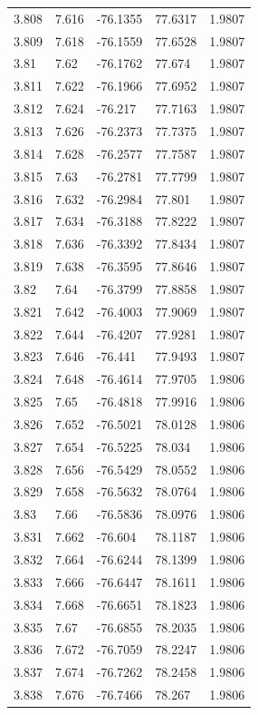 \begin{tabular}{lllll}
3.808 & 7.616 & -76.1355 & 77.6317 & 1.9807 \\
3.809 & 7.618 & -76.1559 & 77.6528 & 1.9807 \\
3.81 & 7.62 & -76.1762 & 77.674 & 1.9807 \\
3.811 & 7.622 & -76.1966 & 77.6952 & 1.9807 \\
3.812 & 7.624 & -76.217 & 77.7163 & 1.9807 \\
3.813 & 7.626 & -76.2373 & 77.7375 & 1.9807 \\
3.814 & 7.628 & -76.2577 & 77.7587 & 1.9807 \\
3.815 & 7.63 & -76.2781 & 77.7799 & 1.9807 \\
3.816 & 7.632 & -76.2984 & 77.801 & 1.9807 \\
3.817 & 7.634 & -76.3188 & 77.8222 & 1.9807 \\
3.818 & 7.636 & -76.3392 & 77.8434 & 1.9807 \\
3.819 & 7.638 & -76.3595 & 77.8646 & 1.9807 \\
3.82 & 7.64 & -76.3799 & 77.8858 & 1.9807 \\
3.821 & 7.642 & -76.4003 & 77.9069 & 1.9807 \\
3.822 & 7.644 & -76.4207 & 77.9281 & 1.9807 \\
3.823 & 7.646 & -76.441 & 77.9493 & 1.9807 \\
3.824 & 7.648 & -76.4614 & 77.9705 & 1.9806 \\
3.825 & 7.65 & -76.4818 & 77.9916 & 1.9806 \\
3.826 & 7.652 & -76.5021 & 78.0128 & 1.9806 \\
3.827 & 7.654 & -76.5225 & 78.034 & 1.9806 \\
3.828 & 7.656 & -76.5429 & 78.0552 & 1.9806 \\
3.829 & 7.658 & -76.5632 & 78.0764 & 1.9806 \\
3.83 & 7.66 & -76.5836 & 78.0976 & 1.9806 \\
3.831 & 7.662 & -76.604 & 78.1187 & 1.9806 \\
3.832 & 7.664 & -76.6244 & 78.1399 & 1.9806 \\
3.833 & 7.666 & -76.6447 & 78.1611 & 1.9806 \\
3.834 & 7.668 & -76.6651 & 78.1823 & 1.9806 \\
3.835 & 7.67 & -76.6855 & 78.2035 & 1.9806 \\
3.836 & 7.672 & -76.7059 & 78.2247 & 1.9806 \\
3.837 & 7.674 & -76.7262 & 78.2458 & 1.9806 \\
3.838 & 7.676 & -76.7466 & 78.267 & 1.9806 \\

\end{tabular}
